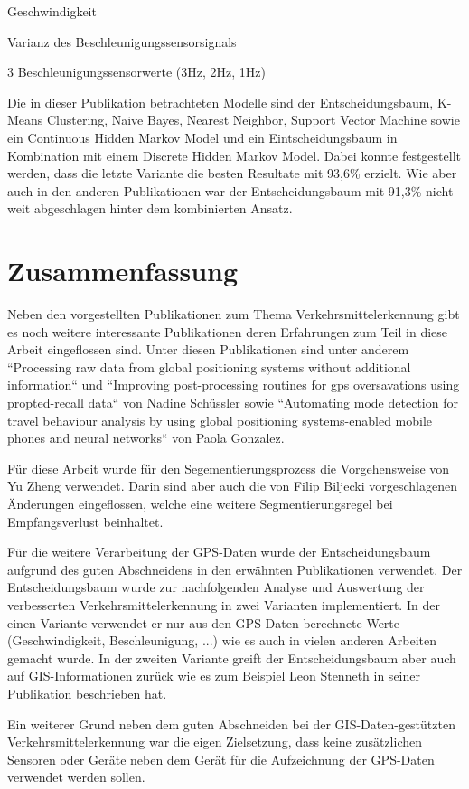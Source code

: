\begin{pitemize}
\item Geschwindigkeit
\item Varianz des Beschleunigungssensorsignals
\item 3 Beschleunigungssensorwerte (3Hz, 2Hz, 1Hz)
\end{pitemize}

Die in dieser Publikation betrachteten Modelle sind der Entscheidungsbaum, K-Means Clustering, Naive Bayes, Nearest Neighbor, Support Vector Machine sowie ein Continuous Hidden Markov Model und ein Eintscheidungsbaum in Kombination mit einem Discrete Hidden Markov Model. Dabei konnte festgestellt werden, dass die letzte Variante die besten Resultate mit 93,6\% erzielt. Wie aber auch in den anderen Publikationen war der Entscheidungsbaum mit 91,3\% nicht weit abgeschlagen hinter dem kombinierten Ansatz.

\section{Zusammenfassung}

Neben den vorgestellten Publikationen zum Thema Verkehrsmittelerkennung gibt es noch weitere interessante Publikationen deren Erfahrungen zum Teil in diese Arbeit eingeflossen sind. Unter diesen Publikationen sind unter anderem ``Processing raw data from global positioning systems without additional information`` \cite{schuessler_processing_2009}  und  ``Improving post-processing routines for gps oversavations using propted-recall data`` \cite{nadine_schussler_improving_2011} von Nadine Schüssler sowie ``Automating mode detection for travel behaviour analysis by using global positioning systems-enabled mobile phones and neural networks`` \cite{gonzalez_automating_2010} von Paola Gonzalez.

Für diese Arbeit wurde für den Segementierungsprozess die Vorgehensweise von Yu Zheng \cite{zheng_understanding_2010} verwendet. Darin sind aber auch die von Filip Biljecki \cite{biljecki_transportation_2013} vorgeschlagenen Änderungen eingeflossen, welche eine weitere Segmentierungsregel bei Empfangsverlust beinhaltet. 

Für die weitere Verarbeitung der GPS-Daten wurde der Entscheidungsbaum aufgrund des guten Abschneidens in den erwähnten Publikationen verwendet. Der Entscheidungsbaum wurde zur nachfolgenden Analyse und Auswertung der verbesserten Verkehrsmittelerkennung in zwei Varianten implementiert. In der einen Variante verwendet er nur aus den GPS-Daten berechnete Werte (Geschwindigkeit, Beschleunigung, ...) wie es auch in vielen anderen Arbeiten gemacht wurde. In der zweiten Variante greift der Entscheidungsbaum aber auch auf GIS-Informationen zurück wie es zum Beispiel Leon Stenneth in seiner Publikation  \cite{stenneth_transportation_2011} beschrieben hat.

Ein weiterer Grund neben dem guten Abschneiden bei der GIS-Daten-gestützten Verkehrsmittelerkennung war die eigen Zielsetzung, dass keine zusätzlichen Sensoren oder Geräte neben dem Gerät für die Aufzeichnung der GPS-Daten verwendet werden sollen.
